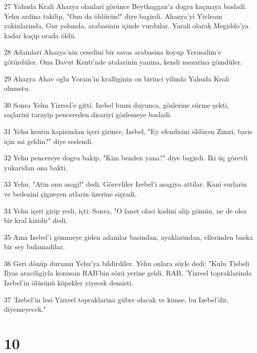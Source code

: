 \par 27 Yahuda Krali Ahazya olanlari görünce Beythaggan'a dogru kaçmaya basladi. Yehu ardina takilip, "Onu da öldürün!" diye bagirdi. Ahazya'yi Yivleam yakinlarinda, Gur yolunda, arabasinin içinde vurdular. Yarali olarak Megiddo'ya kadar kaçip orada öldü.
\par 28 Adamlari Ahazya'nin cesedini bir savas arabasina koyup Yerusalim'e götürdüler. Onu Davut Kenti'nde atalarinin yanina, kendi mezarina gömdüler.
\par 29 Ahazya Ahav oglu Yoram'in kralliginin on birinci yilinda Yahuda Krali olmustu.
\par 30 Sonra Yehu Yizreel'e gitti. Izebel bunu duyunca, gözlerine sürme çekti, saçlarini tarayip pencereden disariyi gözlemeye basladi.
\par 31 Yehu kentin kapisindan içeri girince, Izebel, "Ey efendisini öldüren Zimri, baris için mi geldin?" diye seslendi.
\par 32 Yehu pencereye dogru bakip, "Kim benden yana?" diye bagirdi. Iki üç görevli yukaridan ona bakti.
\par 33 Yehu, "Atin onu asagi!" dedi. Görevliler Izebel'i asagiya attilar. Kani surlarin ve bedenini çigneyen atlarin üzerine siçradi.
\par 34 Yehu içeri girip yedi, içti. Sonra, "O lanet olasi kadini alip gömün, ne de olsa bir kral kizidir" dedi.
\par 35 Ama Izebel'i gömmeye giden adamlar basindan, ayaklarindan, ellerinden baska bir sey bulamadilar.
\par 36 Geri dönüp durumu Yehu'ya bildirdiler. Yehu onlara söyle dedi: "Kulu Tisbeli Ilyas araciligiyla konusan RAB'bin sözü yerine geldi. RAB, 'Yizreel topraklarinda Izebel'in ölüsünü köpekler yiyecek demisti.
\par 37 'Izebel'in lesi Yizreel topraklarina gübre olacak ve kimse, bu Izebel'dir, diyemeyecek."

\chapter{10}

